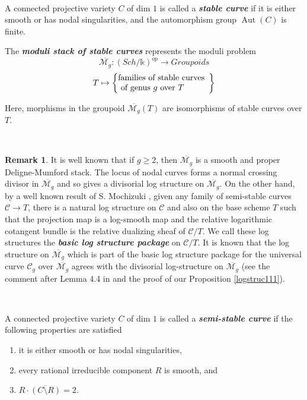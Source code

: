 \documentclass[11pt]{amsart}
\DeclareMathOperator{\Aut}{Aut}
\theoremstyle{plain}
\numberwithin{equation}{section}
\theoremstyle{definition}
\newtheorem{Rem}[Def]{Remark}
\theoremstyle{plain}
\begin{document}
\

\noindent
A connected projective variety $C$ of dim $1$ is called a \emph{\bfseries stable curve} if it is either smooth or has nodal singularities, and the automorphism group $\Aut (C)$ is finite. 

The \emph{\bfseries moduli stack of stable curves} represents the moduli problem
$$
\overline{\mathcal M_g}: (Sch/\mathbb k)^{op} \longrightarrow Groupoids 
$$ 
\begin{equation}
T
\mapsto \left\{
\begin{array}{@{}ll@{}}
\text{families of stable curves}\\
\text{ of genus} ~g~\text{over}~T
\end{array}\right\}
\end{equation}

\vspace{1em}

Here, morphisms in the groupoid $\overline{\mathcal M_g}(T)$ are isomorphisms of stable curves over $T$.

\ 

\begin{Rem}\label{Rem:Moch} It is well known that if $g\geq 2$, then $\overline{\mathcal M_g}$ is a smooth and proper Deligne-Mumford stack. The locus of nodal curves forms a normal crossing divisor in $\overline{\mathcal M_g}$ and so gives a divisorial log structure on $\overline{\mathcal M_g}$. On the other hand, by a well known result of S. Mochizuki \cite[\S 3B.]{M}, given any family of semi-stable curves $\mathcal C\to T$, there is a natural log structure on $\mathcal C$ and also on the base scheme $T$ such that the projection map is a log-smooth map and the relative logarithmic cotangent bundle is the relative dualizing sheaf of $\mathcal C/T$. We call these log structures the \emph{\bfseries basic log structure package} on $\mathcal C/T$. It is known that the log structure on $\overline{\mathcal M_g}$ which is part of the basic log structure package for the universal curve $\mathcal C_g$ over $\overline{\mathcal M_g}$ agrees with the divisorial log-structure on $\overline{\mathcal M_g}$ (see the comment after Lemma 4.4 in \cite{17} and the proof of our Proposition \ref{logstruc111}).
\end{Rem}

\


\noindent
A connected projective variety $C$ of dim $1$ is called a \emph{\bfseries semi-stable curve} if the following properties are satisfied
\begin{enumerate} 
\item it is either smooth or has nodal singularities, 
\item every rational irreducible component $R$ is smooth, and 
\item $R\cdot \overline{(C\setminus R)}=2$.
\end{enumerate}
\end{document}
